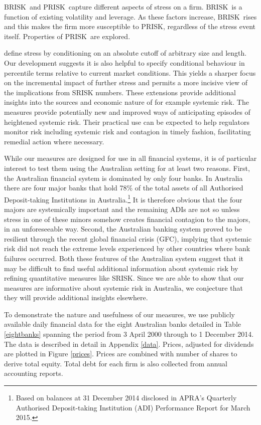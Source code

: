 \documentclass[12pt]{article}
\newcommand{\br}{\ensuremath{\mathrm{BRISK}}}
\newcommand{\pr}{\ensuremath{\mathrm{PRISK}}}
\newcommand{\fref}[1]{Figure \ref{#1}}
\newcommand{\tref}[1]{Table \ref{#1}}
\newcommand{\aref}[1]{Appendix \ref{#1}}
\begin{document}
\br\  and \pr\  capture different aspects of stress on a firm. \br\  is a function of existing volatility and leverage. As these factors increase, \br\  rises and this makes the firm more susceptible to \pr, regardless of the stress event itself.   Properties of \pr\  are explored.
   
\cite{brownlees2015} define stress by conditioning on an absolute cutoff of arbitrary size and length. Our development suggests  it is also helpful to specify conditional behaviour in percentile terms relative to current market conditions. This yields a sharper focus on the incremental impact of further stress and permits a more incisive view of the  implications from SRISK numbers. These extensions provide additional insights into the sources and economic nature of for example systemic risk. The measures provide potentially new and improved ways of anticipating episodes of heightened systemic risk. Their practical use can be expected to help regulators monitor risk including systemic risk and contagion in timely fashion,   facilitating remedial action where necessary.

While our measures are designed for use in all financial systems, it is of particular interest to test them using the Australian setting for at least two reasons. First, the Australian financial system is dominated by only four banks. In Australia there are four major banks that hold 78\% of the total assets of all Authorised Deposit-taking Institutions in  Australia.\footnote{Based on balances at 31 December 2014 disclosed in APRA's Quarterly Authorised Deposit-taking Institution (ADI) Performance Report for March 2015.} It is therefore obvious that the four majors are systemically important and the remaining ADIs are not so unless stress in one of these minors somehow creates financial contagion to the majors, in an unforeseeable way. Second, the Australian banking system proved to be resilient through the recent global financial crisis (GFC), implying that systemic risk did not reach the extreme levels experienced by other countries where bank failures occurred. Both these features of the Australian system suggest that it may be difficult to find useful additional information about systemic risk by refining quantitative measures like SRISK. Since we are able to show that our measures are informative about systemic risk in Australia, we conjecture that they will provide additional insights elsewhere.  

To demonstrate the nature and usefulness of our measures, we use publicly available daily financial data for the eight Australian banks detailed in \tref{eightbanks} spanning the period from  3 April 2000 through to 1 December 2014.  The data is described in detail in \aref{data}.  Prices, adjusted for dividends are plotted in \fref{prices}.  Prices are combined with number of shares to derive total equity. Total debt for each firm is also collected from annual accounting reports. 
\end{document}
